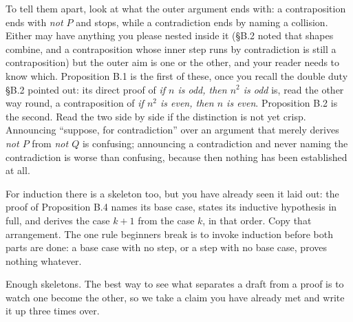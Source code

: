 \documentclass[a4paper,12pt,oneside]{memoir}
\begin{document}
To tell them apart, look at what the outer argument ends with: a contraposition ends with \emph{not \(P\)} and stops, while a contradiction ends by naming a collision. Either may have anything you please nested inside it (§B.2 noted that shapes combine, and a contraposition whose inner step runs by contradiction is still a contraposition) but the outer aim is one or the other, and your reader needs to know which. Proposition B.1 is the first of these, once you recall the double duty §B.2 pointed out: its direct proof of \emph{if \(n\) is odd, then \(n^{2}\) is odd} is, read the other way round, a contraposition of \emph{if \(n^{2}\) is even, then \(n\) is even}. Proposition B.2 is the second. Read the two side by side if the distinction is not yet crisp. Announcing “suppose, for contradiction” over an argument that merely derives \emph{not \(P\)} from \emph{not \(Q\)} is confusing; announcing a contradiction and never naming the contradiction is worse than confusing, because then nothing has been established at all.

For induction there is a skeleton too, but you have already seen it laid out: the proof of Proposition B.4 names its base case, states its inductive hypothesis in full, and derives the case \(k + 1\) from the case \(k\), in that order. Copy that arrangement. The one rule beginners break is to invoke induction before both parts are done: a base case with no step, or a step with no base case, proves nothing whatever.

Enough skeletons. The best way to see what separates a draft from a proof is to watch one become the other, so we take a claim you have already met and write it up three times over.
\end{document}
